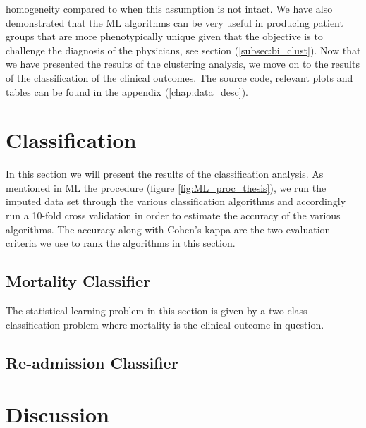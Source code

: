 \documentclass[../thesis.tex]{subfiles}
\begin{document}
homogeneity compared to when this assumption is not intact. We have also demonstrated that the ML algorithms can be very useful in producing patient groups that are more phenotypically unique given that the objective is to challenge the diagnosis of the physicians, see section (\ref{subsec:bi_clust}). Now that we have presented the results of the clustering analysis, we move on to the results of the classification of the clinical outcomes. The source code, relevant plots and tables can be found in the appendix (\ref{chap:data_desc}).

\section{Classification}

\noindent In this section we will present the results of the classification analysis. As mentioned in ML the procedure (figure \ref{fig:ML_proc_thesis}), we run the imputed data set through the various classification algorithms and accordingly run a 10-fold cross validation in order to estimate the accuracy of the various algorithms. The accuracy along with Cohen’s kappa are the two evaluation criteria we use to rank the algorithms in this section.

\subsection{Mortality Classifier}

\noindent The statistical learning problem in this section is given by a two-class
classification problem where mortality is the clinical outcome in question.

\subsection{Re-admission Classifier}

\section{Discussion}
\end{document}
